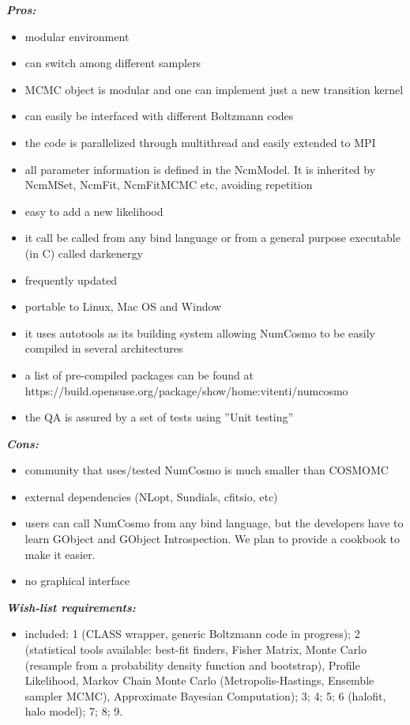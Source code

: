 {\it \bf Pros:} 
\begin{itemize}
 \item modular environment
 \item	can switch among different samplers
 \item MCMC object is modular and one can implement just a new transition kernel
\item 	can easily be interfaced with different Boltzmann codes
\item 	the code is parallelized through multithread and easily extended to MPI
\item 	all parameter information is defined in the NcmModel. It is inherited by NcmMSet, NcmFit, NcmFitMCMC etc, avoiding repetition
\item 	easy to add a new likelihood
\item 	it call be called from any bind language or from a general purpose executable (in C) called darkenergy
\item 	frequently updated
\item 	portable to Linux, Mac OS and Window
\item 	it uses autotools as its building system allowing NumCosmo to be easily compiled in several architectures
\item 	a list of pre-compiled packages can be found at https://build.opensuse.org/package/show/home:vitenti/numcosmo
\item 	the QA is assured by a set of tests using ''Unit testing''

 \end{itemize}

{\it \bf Cons:} 
\begin{itemize}
 \item 	community that uses/tested NumCosmo is much smaller than COSMOMC
 \item 	external dependencies (NLopt, Sundials, cfitsio, etc)
 \item 	users can call NumCosmo from any bind language, but the developers have to learn GObject and GObject Introspection. We plan to provide a cookbook to make it easier.
 \item 	no graphical interface
 \end{itemize}

{\it \bf Wish-list requirements: }
\begin{itemize}
 \item included: 1 (CLASS wrapper, generic Boltzmann code in progress); 2 (statistical tools available: best-fit finders, Fisher Matrix,  Monte Carlo (resample from a probability density function and bootstrap), Profile Likelihood, Markov Chain Monte Carlo (Metropolis-Hastings, Ensemble sampler MCMC), Approximate Bayesian Computation); 3; 4; 5; 6 (halofit, halo model); 7; 8; 9.
\end{itemize}

